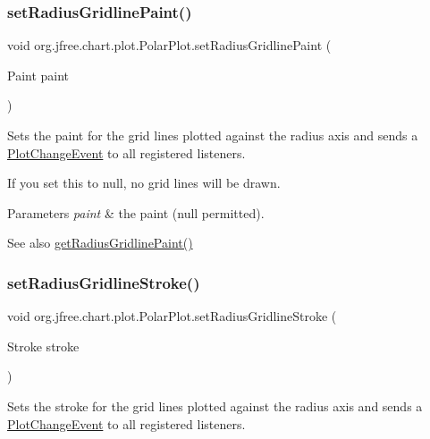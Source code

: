 \subsubsection{\texorpdfstring{set\+Radius\+Gridline\+Paint()}{setRadiusGridlinePaint()}}
{\footnotesize\ttfamily void org.\+jfree.\+chart.\+plot.\+Polar\+Plot.\+set\+Radius\+Gridline\+Paint (\begin{DoxyParamCaption}\item[{Paint}]{paint }\end{DoxyParamCaption})}

Sets the paint for the grid lines plotted against the radius axis and sends a \mbox{\hyperlink{}{Plot\+Change\+Event}} to all registered listeners. 

If you set this to {\ttfamily null}, no grid lines will be drawn.


\begin{DoxyParams}{Parameters}
{\em paint} & the paint ({\ttfamily null} permitted).\\
\hline
\end{DoxyParams}
\begin{DoxySeeAlso}{See also}
\mbox{\hyperlink{classorg_1_1jfree_1_1chart_1_1plot_1_1_polar_plot_a4589a05cc95f039c6c054f6657f3f659}{get\+Radius\+Gridline\+Paint()}} 
\end{DoxySeeAlso}
\mbox{\label{classorg_1_1jfree_1_1chart_1_1plot_1_1_polar_plot_a925128302a5680329e7629b689568d6c}} 
\subsubsection{\texorpdfstring{set\+Radius\+Gridline\+Stroke()}{setRadiusGridlineStroke()}}
{\footnotesize\ttfamily void org.\+jfree.\+chart.\+plot.\+Polar\+Plot.\+set\+Radius\+Gridline\+Stroke (\begin{DoxyParamCaption}\item[{Stroke}]{stroke }\end{DoxyParamCaption})}

Sets the stroke for the grid lines plotted against the radius axis and sends a \mbox{\hyperlink{}{Plot\+Change\+Event}} to all registered listeners. 

